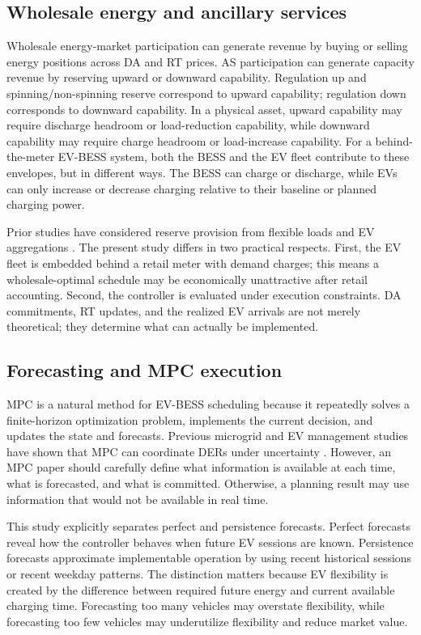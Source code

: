 \documentclass[final,5p,times]{elsarticle}
\begin{document}
\subsection{Wholesale energy and ancillary services}
Wholesale energy-market participation can generate revenue by buying or selling energy positions across DA and RT prices. AS participation can generate capacity revenue by reserving upward or downward capability. Regulation up and spinning/non-spinning reserve correspond to upward capability; regulation down corresponds to downward capability. In a physical asset, upward capability may require discharge headroom or load-reduction capability, while downward capability may require charge headroom or load-increase capability. For a behind-the-meter EV-BESS system, both the BESS and the EV fleet contribute to these envelopes, but in different ways. The BESS can charge or discharge, while EVs can only increase or decrease charging relative to their baseline or planned charging power.

Prior studies have considered reserve provision from flexible loads and EV aggregations \cite{thrane2024reserve}. The present study differs in two practical respects. First, the EV fleet is embedded behind a retail meter with demand charges; this means a wholesale-optimal schedule may be economically unattractive after retail accounting. Second, the controller is evaluated under execution constraints. DA commitments, RT updates, and the realized EV arrivals are not merely theoretical; they determine what can actually be implemented.

\subsection{Forecasting and MPC execution}
MPC is a natural method for EV-BESS scheduling because it repeatedly solves a finite-horizon optimization problem, implements the current decision, and updates the state and forecasts. Previous microgrid and EV management studies have shown that MPC can coordinate DERs under uncertainty \cite{parisio2014model,wang2018predictive,li2021learning}. However, an MPC paper should carefully define what information is available at each time, what is forecasted, and what is committed. Otherwise, a planning result may use information that would not be available in real time.

This study explicitly separates perfect and persistence forecasts. Perfect forecasts reveal how the controller behaves when future EV sessions are known. Persistence forecasts approximate implementable operation by using recent historical sessions or recent weekday patterns. The distinction matters because EV flexibility is created by the difference between required future energy and current available charging time. Forecasting too many vehicles may overstate flexibility, while forecasting too few vehicles may underutilize flexibility and reduce market value.
\end{document}
